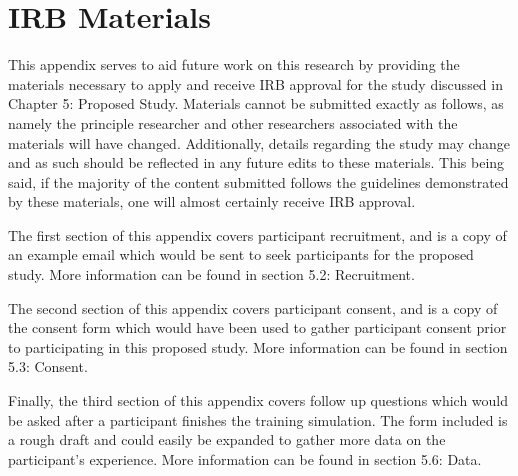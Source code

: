 \chapter{IRB Materials}
\label{App:appA}

This appendix serves to aid future work on this research by providing the materials necessary to apply and receive IRB approval for the study discussed in Chapter 5: Proposed Study. Materials cannot be submitted exactly as follows, as namely the principle researcher and other researchers associated with the materials will have changed. Additionally, details regarding the study may change and as such should be reflected in any future edits to these materials. This being said, if the majority of the content submitted follows the guidelines demonstrated by these materials, one will almost certainly receive IRB approval. 

The first section of this appendix covers participant recruitment, and is a copy of an example email which would be sent to seek participants for the proposed study. More information can be found in section 5.2: Recruitment.

The second section of this appendix covers participant consent, and is a copy of the consent form which would have been used to gather participant consent prior to participating in this proposed study. More information can be found in section 5.3: Consent.

Finally, the third section of this appendix covers follow up questions which would be asked after a participant finishes the training simulation. The form included is a rough draft and could easily be expanded to gather more data on the participant's experience. More information can be found in section 5.6: Data.

\newpage


\newpage


\newpage


%
%

